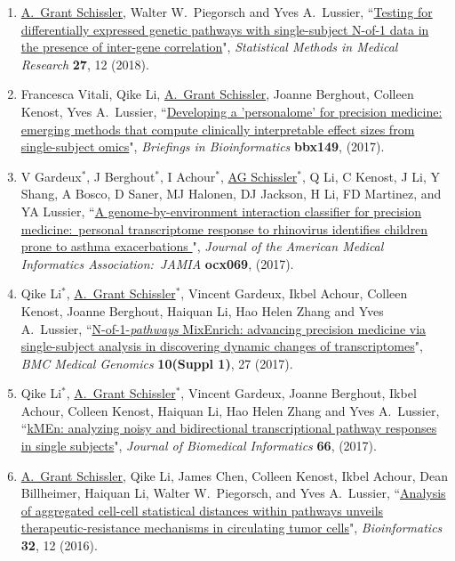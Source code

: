 \documentclass[paper=a4,fontsize=11pt]{scrartcl} %
\newcommand{\PaperEntry}[7]{
		\noindent #1, ``\href{#7}{#2}", \textit{#3} \textbf{#4}, #5 (#6).}
\begin{document}
\begin{enumerate}
  \item \PaperEntry{\underline{A.~Grant Schissler}, Walter W.~Piegorsch and Yves A.~Lussier}{Testing for differentially expressed genetic pathways with single-subject N-of-1 data in the presence of inter-gene correlation}{Statistical Methods in Medical Research}{27}{12}{2018}{http://journals.sagepub.com/doi/10.1177/0962280217712271}

\item \PaperEntry{Francesca Vitali, Qike Li, \underline{A.~Grant Schissler}, Joanne Berghout, Colleen Kenost, Yves A.~Lussier}{Developing a 'personalome' for precision medicine: emerging methods that compute clinically interpretable effect sizes from single-subject omics}{Briefings in Bioinformatics}{bbx149}{}{2017}{https://academic.oup.com/bib/advance-article/doi/10.1093/bib/bbx149/4758622}

  \item \PaperEntry{V Gardeux$^{*}$, J Berghout$^{*}$, I Achour$^{*}$, \underline{AG Schissler}$^{*}$, Q Li, C Kenost, J Li, Y Shang, A Bosco, D Saner, MJ Halonen, DJ Jackson, H Li, FD Martinez, and YA Lussier}{A genome-by-environment interaction classifier for precision medicine:~personal transcriptome response to rhinovirus identifies children prone to asthma exacerbations
}{Journal of the American Medical Informatics Association:~JAMIA}{ocx069}{}{2017}{https://academic.oup.com/jamia/article-abstract/doi/10.1093/jamia/ocx069/4004728/A-genome-by-environment-interaction-classifier-for?redirectedFrom=fulltext}

\item \PaperEntry{Qike Li$^{*}$, \underline{A.~Grant Schissler$^{*}$}, Vincent Gardeux, Ikbel Achour, Colleen Kenost, Joanne Berghout, Haiquan Li, Hao Helen Zhang and Yves A.~Lussier}{N-of-1-\emph{pathways} MixEnrich: advancing precision medicine via single-subject analysis in discovering dynamic changes of transcriptomes}{BMC Medical Genomics}{10(Suppl 1)}{27}{2017}{https://bmcmedgenomics.biomedcentral.com/articles/10.1186/s12920-017-0263-4}

\item \PaperEntry{Qike Li$^{*}$, \underline{A.~Grant Schissler}$^{*}$, Vincent Gardeux, Joanne Berghout, Ikbel Achour, Colleen Kenost, Haiquan Li, Hao Helen Zhang and Yves A.~Lussier}{kMEn: analyzing noisy and bidirectional transcriptional pathway responses in single subjects}{Journal of Biomedical Informatics}{66}{}{2017}{http://www.sciencedirect.com/science/article/pii/S1532046416301836}

\item \PaperEntry{\underline{A.~Grant Schissler}, Qike Li, James Chen, Colleen Kenost, Ikbel Achour, Dean Billheimer, Haiquan Li, Walter W.~Piegorsch, and Yves A.~Lussier}{Analysis of aggregated cell-cell statistical distances within pathways unveils therapeutic-resistance mechanisms in circulating tumor cells}{Bioinformatics}{32}{12}{2016}{http://bioinformatics.oxfordjournals.org/content/32/12/i80.full}


\end{enumerate}
\end{document}
